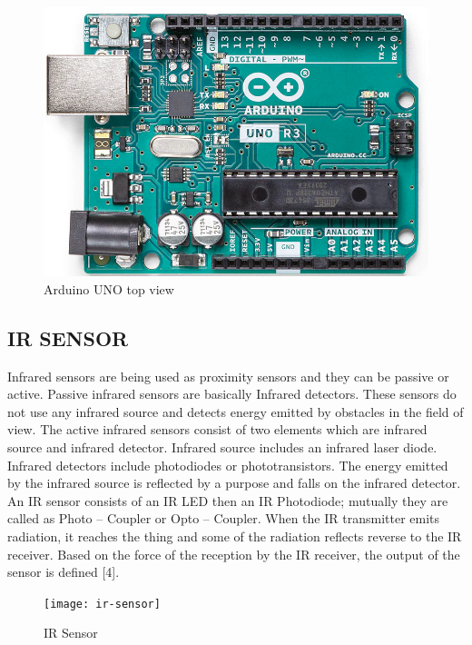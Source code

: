 \documentclass[conference]{IEEEtran}
\begin{document}
    \begin{figure}[htbp]
        \centerline{\includegraphics[scale=0.30]{fig3.png}}
        \caption{Arduino UNO top view}
        \label{fig}
    \end{figure}

    \subsection{IR SENSOR}
    Infrared sensors are being used as proximity sensors and
    they can be passive or active. Passive infrared sensors are
    basically Infrared detectors. These sensors do not use any
    infrared source and detects energy emitted by obstacles in
    the field of view. The active infrared sensors consist of two
    elements which are infrared source and infrared detector.
    Infrared source includes an infrared laser diode. Infrared
    detectors include photodiodes or phototransistors. The
    energy emitted by the infrared source is reflected by a
    purpose and falls on the infrared detector. An IR sensor
    consists of an IR LED then an IR Photodiode; mutually they
    are called as Photo – Coupler or Opto – Coupler. When the IR
    transmitter emits radiation, it reaches the thing and some of
    the radiation reflects reverse to the IR receiver. Based on the
    force of the reception by the IR receiver, the output of the
    sensor is defined [4].

    \begin{figure}[htbp]
        \centerline{\texttt{[image: ir-sensor]}}
        \caption{IR Sensor}
        \label{fig}
    \end{figure}
\end{document}
